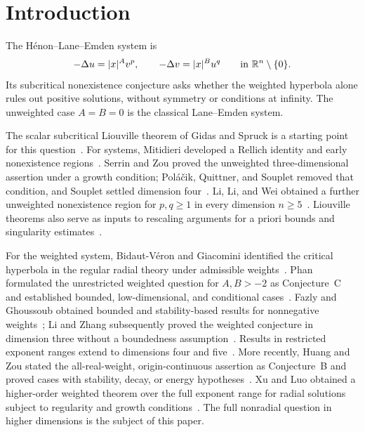 \section{Introduction}\label{sec:introduction}

The H\'enon--Lane--Emden system is
\begin{equation}\label{eq:system}
 -\Delta u=|x|^A v^p,\qquad
 -\Delta v=|x|^B u^q
 \qquad\text{in }\mathbb R^n\setminus\{0\}.
\end{equation}
Its subcritical nonexistence conjecture asks whether the weighted
hyperbola alone rules out positive solutions, without symmetry or
conditions at infinity. The unweighted case \(A=B=0\) is the classical
Lane--Emden system.

The scalar subcritical Liouville theorem of Gidas and Spruck is a
starting point for this question~\cite{GidasSpruck1981}. For systems,
Mitidieri developed a Rellich identity and early nonexistence
regions~\cite{Mitidieri1993,Mitidieri1996}. Serrin and Zou proved the
unweighted three-dimensional assertion under a growth condition;
Pol\'a\v{c}ik, Quittner, and Souplet removed that condition, and
Souplet settled dimension four~\cite{SerrinZou1996,
PolacikQuittnerSouplet2007,Souplet2009}. Li, Li, and Wei obtained a
further unweighted nonexistence region for \(p,q\ge1\) in every dimension
\(n\ge5\)~\cite[Theorem~1.1]{LiLiWei2025}. Liouville theorems also serve
as inputs to rescaling arguments for a priori bounds and singularity
estimates~\cite{GidasSpruckBounds1981,PolacikQuittnerSouplet2007}.

For the weighted system, Bidaut-V\'eron and Giacomini identified the
critical hyperbola in the regular radial theory under admissible
weights~\cite{BidautVeronGiacomini2010}. Phan formulated the unrestricted
weighted question for \(A,B>-2\) as Conjecture~C and established
bounded, low-dimensional, and conditional cases~\cite{Phan}.
Fazly and Ghoussoub obtained bounded and stability-based results for
nonnegative weights~\cite{FazlyGhoussoub2014}; Li and Zhang subsequently
proved the weighted conjecture in dimension three without a boundedness
assumption~\cite{LiZhang2019}. Results in restricted exponent ranges
extend to dimensions four and five~\cite{Li2022}. More recently,
Huang and Zou stated the all-real-weight, origin-continuous assertion
as Conjecture~B and proved cases with stability, decay, or energy
hypotheses~\cite{HuangZou}. Xu and Luo obtained a higher-order weighted
theorem over the full exponent range for radial solutions subject to
regularity and growth conditions~\cite{XuLuo2026}. The full nonradial
question in higher dimensions is the subject of this paper.

